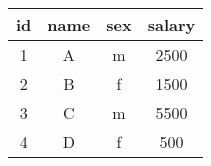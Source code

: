 \begin{tabular}{|c|c|c|c|}
    \hline
        \textbf{id} & \textbf{name} & \textbf{sex} & \textbf{salary} \\ \hline
        1 & A & m & 2500 \\ 
        2 & B & f & 1500 \\ 
        3 & C & m & 5500 \\ 
        4 & D & f & 500 \\ \hline
\end{tabular}
